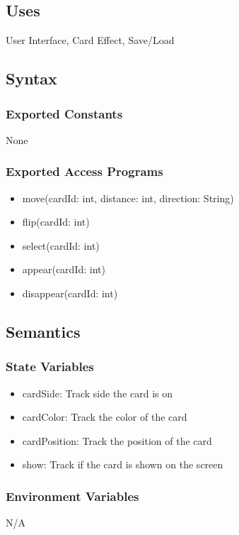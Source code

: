 \documentclass[12pt, titlepage]{article}
\begin{document}
\subsection{Uses}
\hspace{1.5em}User Interface, Card Effect, Save/Load

\subsection{Syntax}

\subsubsection{Exported Constants}
\hspace{1.5em}None

\subsubsection{Exported Access Programs}

\begin{itemize}
\item move(cardId: int, distance: int, direction: String)
\item flip(cardId: int)
\item select(cardId: int)
\item appear(cardId: int)
\item disappear(cardId: int)
\end{itemize}

\subsection{Semantics}

\subsubsection{State Variables}
\begin{itemize}
\item cardSide: Track side the card is on
\item cardColor: Track the color of the card
\item cardPosition: Track the position of the card 
\item show: Track if the card is shown on the screen
\end{itemize}

\subsubsection{Environment Variables}
\hspace{1.5em}N/A
\end{document}
